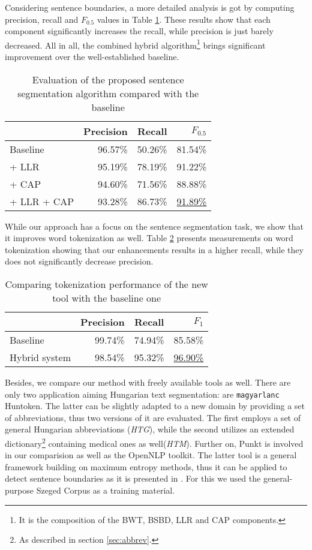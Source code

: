 Considering sentence boundaries, a more detailed analysis is got by computing precision, recall and $F_{0.5}$ values in Table \ref{tab:prec_rec}. These results show that each component significantly increases the recall, while precision is just barely decreased. All in all, the combined hybrid algorithm\footnote{It is the composition of the BWT, BSBD, LLR and CAP components.} brings significant improvement over the well-established baseline.

\begin{table}[h]
\centering
\caption{Evaluation of the proposed sentence segmentation algorithm compared with the baseline}
\label{tab:prec_rec}
\begin{tabular}{ l r r  r  } 
\hline
& Precision & Recall & $F_{0.5}$ \\
\hline
Baseline & 96.57\% & 50.26\% & 81.54\%  \\
+ LLR & 95.19\% & 78.19\% & 91.22\% \\
+ CAP & 94.60\% & 71.56\% & 88.88\% \\
+ LLR + CAP & 93.28\% & 86.73\% & \underline{91.89\%} \\
\hline
\end{tabular}
\end{table}


While our approach has a focus on the sentence segmentation task, we show that it improves word tokenization as well. Table \ref{tab:tok_eval} presents measurements on word tokenization showing that our enhancements results in a higher recall, while they does not significantly decrease precision. \label{sec:eval}

\begin{table}[h]
\centering
\caption{Comparing tokenization performance of the new tool with the baseline one}
\label{tab:tok_eval}
\begin{tabular}{ l r r r} 
\hline
& Precision & Recall & $F_{1}$ \\
\hline
Baseline & 99.74\% & 74.94\% & 85.58\%  \\
Hybrid system & 98.54\% & 95.32\% & \underline{96.90\%} \\
\hline
\end{tabular}
\end{table}

Besides, we compare our method with freely available tools as well.
There are only two application aiming Hungarian text segmentation: are \texttt{magyarlanc} Huntoken.
The latter can be slightly adapted to a new domain by providing a set of abbreviations, thus two versions of it are evaluated. 
The first employs a set of general Hungarian abbreviations (\emph{HTG}), while the second utilizes an extended dictionary\footnote{As described in section \ref{sec:abbrev}.} containing medical ones as well(\emph{HTM}). 
Further on, Punkt \cite{kiss2006unsupervised} is involved in our comparision as well as the OpenNLP \cite{Baldridge2002} toolkit. The latter tool is a general framework building on maximum entropy methods, thus it can be applied to detect sentence boundaries as it is presented in \cite{reynar1997maximum}. For this we used the general-purpose Szeged Corpus as a training material. 


